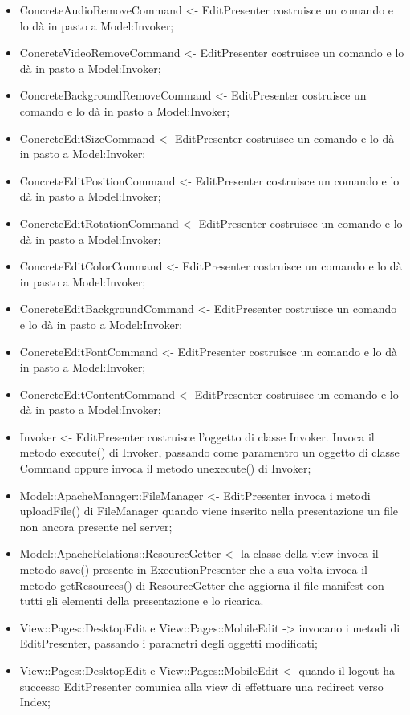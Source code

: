 {{\begin{itemize}
			\item ConcreteAudioRemoveCommand <- EditPresenter costruisce un comando e lo dà in pasto a Model:Invoker;
			\item ConcreteVideoRemoveCommand <- EditPresenter costruisce un comando e lo dà in pasto a Model:Invoker;
			\item ConcreteBackgroundRemoveCommand <- EditPresenter costruisce un comando e lo dà in pasto a Model:Invoker;
			\item ConcreteEditSizeCommand <- EditPresenter costruisce un comando e lo dà in pasto a Model:Invoker;
			\item ConcreteEditPositionCommand <- EditPresenter costruisce un comando e lo dà in pasto a Model:Invoker;
			\item ConcreteEditRotationCommand <- EditPresenter costruisce un comando e lo dà in pasto a Model:Invoker;
			\item ConcreteEditColorCommand <- EditPresenter costruisce un comando e lo dà in pasto a Model:Invoker;
			\item ConcreteEditBackgroundCommand <- EditPresenter costruisce un comando e lo dà in pasto a Model:Invoker;
			\item ConcreteEditFontCommand <- EditPresenter costruisce un comando e lo dà in pasto a Model:Invoker;
			\item ConcreteEditContentCommand <- EditPresenter costruisce un comando e lo dà in pasto a Model:Invoker;
			\item Invoker <- EditPresenter costruisce l’oggetto di classe Invoker. Invoca il metodo execute() di Invoker, passando come paramentro un oggetto di classe Command oppure invoca il metodo unexecute() di Invoker;
			\item Model::ApacheManager::FileManager <- EditPresenter invoca i metodi uploadFile() di FileManager quando viene inserito nella presentazione un file non ancora presente nel server;
			\item Model::ApacheRelations::ResourceGetter <- la classe della view invoca il metodo save() presente in  ExecutionPresenter che a sua volta invoca il metodo getResources() di ResourceGetter che aggiorna il file manifest con tutti gli elementi della presentazione e lo ricarica.
			\item View::Pages::DesktopEdit e View::Pages::MobileEdit -> invocano i metodi di EditPresenter, passando i parametri degli oggetti modificati;
			\item View::Pages::DesktopEdit e View::Pages::MobileEdit <- quando il logout ha successo EditPresenter comunica alla view di effettuare una redirect verso Index;

\end{itemize}}}
